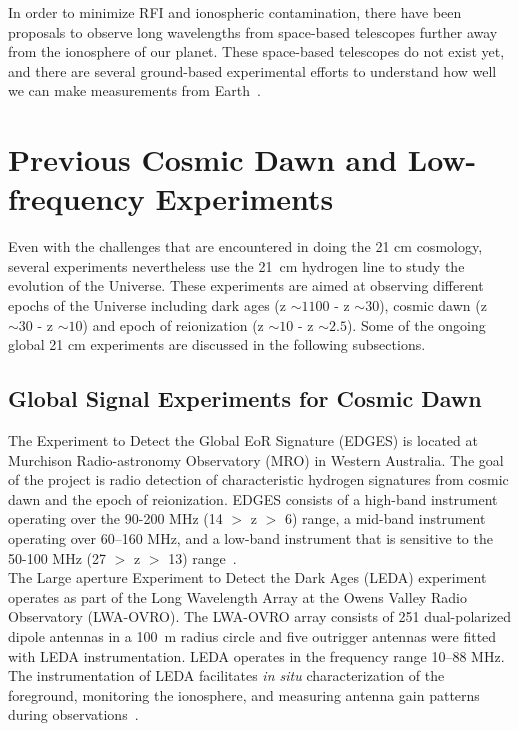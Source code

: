 	    
	    In order to minimize RFI and ionospheric contamination, there have been proposals to observe long wavelengths from space-based telescopes further away from the ionosphere of our planet. These space-based telescopes do not exist yet, and there are several ground-based experimental efforts to understand how well we can make measurements from Earth~\citep{2016ExA....41..271R}. \\
	    
	    \section{Previous Cosmic Dawn and Low-frequency Experiments}
	    
	    Even with the challenges that are encountered in doing the 21 cm cosmology, several experiments nevertheless use the \SI{21}{cm} hydrogen line to study the evolution of the Universe. These experiments are aimed at observing different epochs of the Universe including dark ages (z $\sim1100$ - z $\sim30$), cosmic dawn (z $\sim30$ - z $\sim10$) and epoch of reionization (z $\sim10$ - z $\sim2.5$). Some of the ongoing global 21 cm experiments are discussed in the following subsections.\\
	    
	    
	    \subsection{Global Signal Experiments for Cosmic Dawn}
	    
	    The Experiment to Detect the Global EoR Signature (EDGES) is located at Murchison Radio-astronomy Observatory (MRO) in Western Australia. The goal of the project is radio detection of characteristic hydrogen signatures from cosmic dawn and the epoch of reionization. EDGES consists of a high-band instrument operating over the 90-200 MHz (14 $>$ z $>$ 6) range, a mid-band instrument operating over 60–160 MHz, and a low-band instrument that is sensitive to the 50-100 MHz (27 $>$ z $>$ 13) range~\cite{2017ApJ...835...49M}.\\
	    
	    The Large aperture Experiment to Detect the Dark Ages (LEDA) experiment operates as part of the Long Wavelength Array at the Owens Valley Radio Observatory (LWA-OVRO). The LWA-OVRO array consists of 251 dual-polarized dipole antennas in a \SI{100}{\meter} radius circle and five outrigger antennas were fitted with LEDA instrumentation. LEDA operates in the frequency range 10–88 MHz. The instrumentation of LEDA facilitates \textit{in situ} characterization of the foreground, monitoring the ionosphere, and measuring antenna gain patterns during observations~\citep{2012JAI.....150004T, 2018MNRAS.478.4193P}.\\
	    
